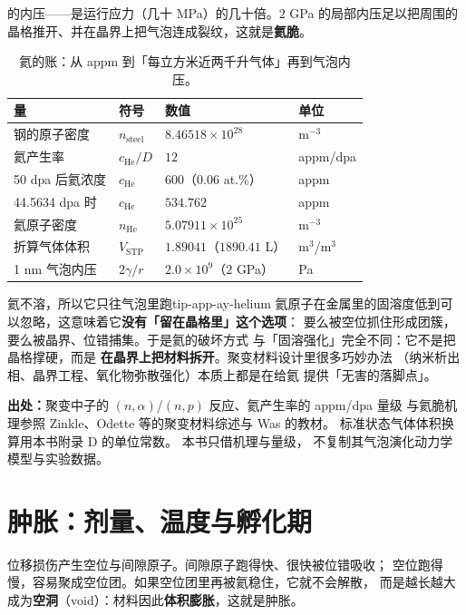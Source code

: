 的内压——是运行应力（几十 MPa）的几十倍。$2$ GPa 的局部内压足以把周围的
晶格推开、并在晶界上把气泡连成裂纹，这就是\textbf{氦脆}。

\begin{table}[htbp]
\centering
\small
\setlength{\tabcolsep}{4pt}
\caption{氦的账：从 appm 到「每立方米近两千升气体」再到气泡内压。}
\label{tab:app-ay-he}
\begin{tabular}{p{4.6cm}p{3.2cm}p{3.4cm}p{2.2cm}}
\toprule
量 & 符号 & 数值 & 单位 \\
\midrule
钢的原子密度 & $n_\mathrm{steel}$ & $8.46518\times10^{28}$ & m$^{-3}$ \\
氦产生率 & $c_\mathrm{He}/D$ & $12$ & appm/dpa \\
50 dpa 后氦浓度 & $c_\mathrm{He}$ & $600$（$0.06$ at.\%） & appm \\
44.5634 dpa 时 & $c_\mathrm{He}$ & $534.762$ & appm \\
氦原子密度 & $n_\mathrm{He}$ & $5.07911\times10^{25}$ & m$^{-3}$ \\
折算气体体积 & $V_\mathrm{STP}$ & $1.89041$（$1890.41$ L） & m$^3$/m$^3$ \\
1 nm 气泡内压 & $2\gamma/r$ & $2.0\times10^{9}$（$2$ GPa） & Pa \\
\bottomrule
\end{tabular}

\end{table}

\begin{tip}{氦不溶，所以它只往气泡里跑}{tip-app-ay-helium}
氦原子在金属里的固溶度低到可以忽略，这意味着它\textbf{没有「留在晶格里」这个选项}：
要么被空位抓住形成团簇，要么被晶界、位错捕集。于是氦的破坏方式
与「固溶强化」完全不同：它不是把晶格撑硬，而是
\textbf{在晶界上把材料拆开}。聚变材料设计里很多巧妙办法
（纳米析出相、晶界工程、氧化物弥散强化）本质上都是在给氦
提供「无害的落脚点」。
\end{tip}

{\footnotesize
\textbf{出处：}聚变中子的 $(n,\alpha)$/$(n,p)$ 反应、氦产生率的 appm/dpa 量级
与氦脆机理参照 Zinkle、Odette 等的聚变材料综述与 Was 的教材。
标准状态气体体积换算用本书附录 D 的单位常数。
本书只借机理与量级，
不复制其气泡演化动力学模型与实验数据。
\section{肿胀：剂量、温度与孵化期}
\label{sec:app-ay-swell}
}

位移损伤产生空位与间隙原子。间隙原子跑得快、很快被位错吸收；
空位跑得慢，容易聚成空位团。如果空位团里再被氦稳住，它就不会解散，
而是越长越大成为\textbf{空洞}（void）：材料因此\textbf{体积膨胀}，这就是肿胀。

